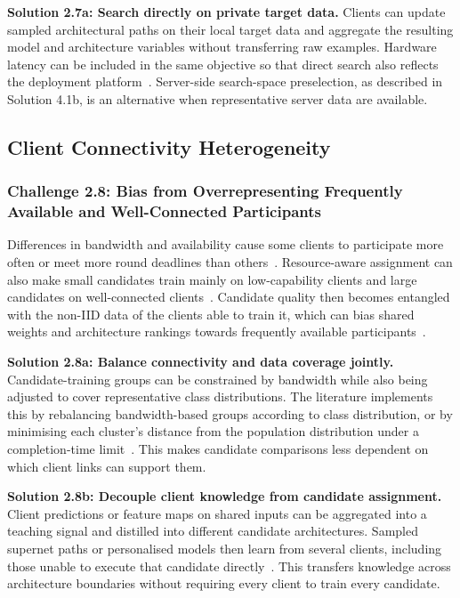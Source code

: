 \noindent\textbf{Solution 2.7a: Search directly on private target data.} Clients can update sampled architectural paths on their local target data and aggregate the resulting model and architecture variables without transferring raw examples. Hardware latency can be included in the same objective so that direct search also reflects the deployment platform~\cite{privacy-preserving_nas_across_fl_iot_2021}. Server-side search-space preselection, as described in Solution 4.1b, is an alternative when representative server data are available.

\subsection{Client Connectivity Heterogeneity}

\subsubsection{Challenge 2.8: Bias from Overrepresenting Frequently Available and Well-Connected Participants}

Differences in bandwidth and availability cause some clients to participate more often or meet more round deadlines than others~\cite{optimize_fednas_edge_2021,peaches_2024}. Resource-aware assignment can also make small candidates train mainly on low-capability clients and large candidates on well-connected clients~\cite{fedoras_2022}. Candidate quality then becomes entangled with the non-IID data of the clients able to train it, which can bias shared weights and architecture rankings towards frequently available participants~\cite{hapfnas_2025}.

\noindent\textbf{Solution 2.8a: Balance connectivity and data coverage jointly.} Candidate-training groups can be constrained by bandwidth while also being adjusted to cover representative class distributions. The literature implements this by rebalancing bandwidth-based groups according to class distribution, or by minimising each cluster's distance from the population distribution under a completion-time limit~\cite{network_aware_fed_nas_2025,finch_2024}. This makes candidate comparisons less dependent on which client links can support them.

\noindent\textbf{Solution 2.8b: Decouple client knowledge from candidate assignment.} Client predictions or feature maps on shared inputs can be aggregated into a teaching signal and distilled into different candidate architectures. Sampled supernet paths or personalised models then learn from several clients, including those unable to execute that candidate directly~\cite{hapfnas_2025,collaborative_nas_for_pfl_2025}. This transfers knowledge across architecture boundaries without requiring every client to train every candidate.

